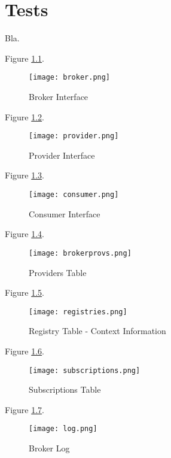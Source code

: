 \chapter{Tests}
\label{chap:tests}
Bla.

 
Figure \ref{fig:broker}. \par

\begin{figure}[H]
	\centering
	\texttt{[image: broker.png]}
	\caption{Broker Interface}
	\label{fig:broker}
	
\end{figure}

Figure \ref{fig:provider}. \par

\begin{figure}[H]
	\centering
	\texttt{[image: provider.png]}
	\caption{Provider Interface}
	\label{fig:provider}
	
\end{figure}

Figure \ref{fig:consumer}. \par

\begin{figure}[H]
	\centering
	\texttt{[image: consumer.png]}
	\caption{Consumer Interface}
	\label{fig:consumer}
	
\end{figure}

Figure \ref{fig:brokerprovs}. \par

\begin{figure}[H]
	\centering
	\texttt{[image: brokerprovs.png]}
	\caption{Providers Table}
	\label{fig:brokerprovs}
	
\end{figure}

Figure \ref{fig:registries}. \par

\begin{figure}[H]
	\centering
	\texttt{[image: registries.png]}
	\caption{Registry Table - Context Information}
	\label{fig:registries}
	
\end{figure}

Figure \ref{fig:subscriptions}. \par

\begin{figure}[H]
	\centering
	\texttt{[image: subscriptions.png]}
	\caption{Subscriptions Table}
	\label{fig:subscriptions}
	
\end{figure}

Figure \ref{fig:log}. \par

\begin{figure}[H]
	\centering
	\texttt{[image: log.png]}
	\caption{Broker Log}
	\label{fig:log}
	
\end{figure}

 